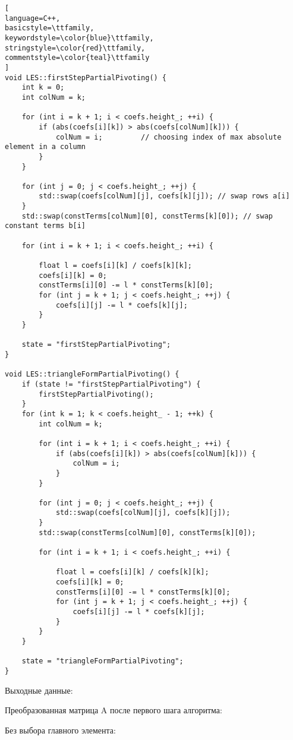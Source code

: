 \documentclass[a4paper, 12pt]{article}
\begin{document}
\scriptsize
\begin{lstlisting}[
language=C++,
basicstyle=\ttfamily,
keywordstyle=\color{blue}\ttfamily,
stringstyle=\color{red}\ttfamily,
commentstyle=\color{teal}\ttfamily
]
void LES::firstStepPartialPivoting() {
	int k = 0;
	int colNum = k;
	
	for (int i = k + 1; i < coefs.height_; ++i) {
		if (abs(coefs[i][k]) > abs(coefs[colNum][k])) { 
			colNum = i; 		// choosing index of max absolute element in a column
		}
	}
	
	for (int j = 0; j < coefs.height_; ++j) {
		std::swap(coefs[colNum][j], coefs[k][j]); // swap rows a[i]
	}
	std::swap(constTerms[colNum][0], constTerms[k][0]); // swap constant terms b[i]
	
	for (int i = k + 1; i < coefs.height_; ++i) {
	
		float l = coefs[i][k] / coefs[k][k];
		coefs[i][k] = 0;
		constTerms[i][0] -= l * constTerms[k][0];
		for (int j = k + 1; j < coefs.height_; ++j) {
			coefs[i][j] -= l * coefs[k][j];
		}
	}
	
	state = "firstStepPartialPivoting";
}

void LES::triangleFormPartialPivoting() {
	if (state != "firstStepPartialPivoting") {
		firstStepPartialPivoting();
	}
	for (int k = 1; k < coefs.height_ - 1; ++k) {
		int colNum = k;
		
		for (int i = k + 1; i < coefs.height_; ++i) {
			if (abs(coefs[i][k]) > abs(coefs[colNum][k])) {
				colNum = i;
			}
		}
	
		for (int j = 0; j < coefs.height_; ++j) {
			std::swap(coefs[colNum][j], coefs[k][j]);
		}
		std::swap(constTerms[colNum][0], constTerms[k][0]);
	
		for (int i = k + 1; i < coefs.height_; ++i) {
	
			float l = coefs[i][k] / coefs[k][k];
			coefs[i][k] = 0;
			constTerms[i][0] -= l * constTerms[k][0];
			for (int j = k + 1; j < coefs.height_; ++j) {
				coefs[i][j] -= l * coefs[k][j];
			}
		}
	}
	
	state = "triangleFormPartialPivoting";
}
\end{lstlisting}

\normalsize Выходные данные:

Преобразованная матрица A после первого шага алгоритма:

Без выбора главного элемента:
\tiny
\end{document}
